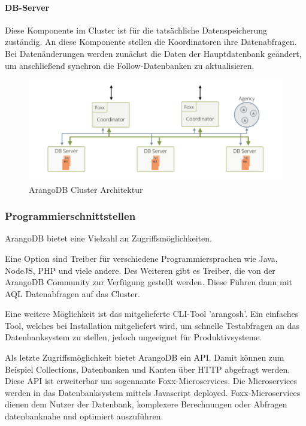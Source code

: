 \paragraph{DB-Server} 
Diese Komponente im Cluster ist für die tatsächliche Datenspeicherung zuständig. An diese Komponente stellen die Koordinatoren ihre Datenabfragen. Bei Datenänderungen werden zunächst die Daten der Hauptdatenbank geändert, um anschließend synchron die Follow-Datenbanken zu aktualisieren.

\begin{figure}[htbp] 
  	\centering
     \includegraphics[width=1\textwidth]{./images/cluster-arch.png}
 	\caption{ArangoDB Cluster Architektur \cite{ADB_clusterarch}}
  \label{fig:ClusterArch}
\end{figure}


\subsubsection{Programmierschnittstellen}
ArangoDB bietet eine Vielzahl an Zugriffsmöglichkeiten.

Eine Option sind Treiber für verschiedene Programmiersprachen wie Java, NodeJS, PHP und viele andere. Des Weiteren gibt es Treiber, die von der ArangoDB Community zur Verfügung gestellt werden. \cite{ADB_driver} Diese Führen dann mit \ac{AQL} Datenabfragen auf das Cluster. 

Eine weitere Möglichkeit ist das mitgelieferte \ac{CLI}-Tool 'arangosh'. Ein einfaches Tool, welches bei Installation mitgeliefert wird, um schnelle Testabfragen an das Datenbanksystem zu stellen, jedoch ungeeignet für Produktivsysteme. \cite{ADB_arangosh}

Als letzte Zugriffsmöglichkeit bietet ArangoDB ein \ac{API}. Damit können zum Beispiel Collections, Datenbanken und Kanten über \ac{HTTP} abgefragt werden. \cite{ADB_api} Diese \ac{API} ist erweiterbar um sogennante Foxx-Microservices. Die Microservices werden in das Datenbanksystem mittels Javascript deployed. Foxx-Microservices dienen dem Nutzer der Datenbank, komplexere Berechnungen oder Abfragen datenbanknahe und optimiert auszuführen. \cite{ADB_foxx}

